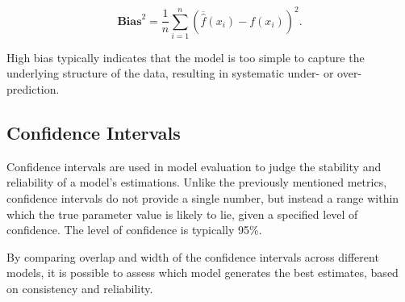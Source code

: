 $$
\textbf{Bias}^2 = \frac{1}{n} \sum_{i=1}^{n} (\overline{\hat{f}}(x_i) - f(x_i))^{2}.
$$

High bias typically indicates that the model is too simple to capture the underlying structure of the data, resulting in systematic under- or over-prediction.



\subsection{Confidence Intervals}
Confidence intervals are used in model evaluation to judge the stability and reliability of a model's estimations. Unlike the previously mentioned metrics, confidence intervals do not provide a single number, but instead a range within which the true parameter value is likely to lie, given a specified level of confidence. The level of confidence is typically 95\%.

By comparing overlap and width of the confidence intervals across different models, it is possible to assess which model generates the best estimates, based on consistency and reliability.
